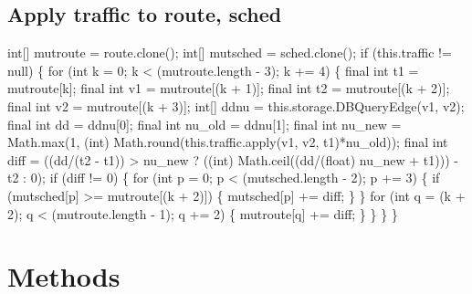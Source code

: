 \subsection{Apply traffic to route, sched}
\nwenddocs{}\endmoddef{}
int[] mutroute = route.clone();
int[] mutsched = sched.clone();
if (this.traffic != null) \{
  for (int k = 0; k < (mutroute.length - 3); k += 4) \{
    final int t1 = mutroute[k];
    final int v1 = mutroute[(k + 1)];
    final int t2 = mutroute[(k + 2)];
    final int v2 = mutroute[(k + 3)];
    int[] ddnu = this.storage.DBQueryEdge(v1, v2);
    final int dd = ddnu[0];
    final int nu_old = ddnu[1];
    final int nu_new = Math.max(1, (int) Math.round(this.traffic.apply(v1, v2, t1)*nu_old));
    final int diff = ((dd/(t2 - t1)) > nu_new
        ? ((int) Math.ceil((dd/(float) nu_new + t1))) - t2
        : 0);
    if (diff != 0) \{
      for (int p = 0; p < (mutsched.length - 2); p += 3) \{
        if (mutsched[p] >= mutroute[(k + 2)]) \{
          mutsched[p] += diff;
        \}
      \}
      for (int q = (k + 2); q < (mutroute.length - 1); q += 2) \{
        mutroute[q] += diff;
      \}
    \}
  \}
\}
\nwendcode{}\nwdocspar

\section{Methods}

